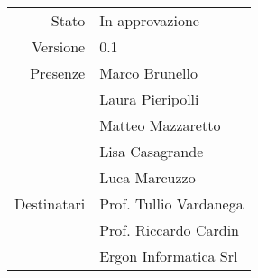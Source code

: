 \begin{center}
\begin{tabular}{r|l}
	Stato & In approvazione \\
	Versione & 0.1 \\
	Presenze & Marco Brunello \\
	         & Laura Pieripolli \\
	         & Matteo Mazzaretto \\
	         & Lisa Casagrande \\
	         & Luca Marcuzzo \\
	Destinatari & Prof. Tullio Vardanega \\
	            & Prof. Riccardo Cardin \\
				& Ergon Informatica Srl
\end{tabular}
\end{center}
